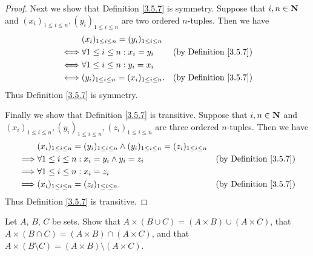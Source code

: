 \begin{proof}
    Next we show that Definition \ref{3.5.7} is symmetry.
    Suppose that \(i, n \in \mathbf{N}\) and \((x_i)_{1 \leq i \leq n}, (y_i)_{1 \leq i \leq n}\) are two ordered \(n\)-tuples.
    Then we have
    \begin{align*}
             & (x_i)_{1 \leq i \leq n} = (y_i)_{1 \leq i \leq n}                                       \\
        \iff & \forall 1 \leq i \leq n : x_i = y_i                & \text{(by Definition \ref{3.5.7})} \\
        \iff & \forall 1 \leq i \leq n : y_i = x_i                                                     \\
        \iff & (y_i)_{1 \leq i \leq n} = (x_i)_{1 \leq i \leq n}. & \text{(by Definition \ref{3.5.7})}
    \end{align*}
    Thus Definition \ref{3.5.7} is symmetry.

    Finally we show that Definition \ref{3.5.7} is transitive.
    Suppose that \(i, n \in \mathbf{N}\) and \((x_i)_{1 \leq i \leq n}, (y_i)_{1 \leq i \leq n}, (z_i)_{1 \leq i \leq n}\) are three ordered \(n\)-tuples.
    Then we have
    \begin{align*}
                 & (x_i)_{1 \leq i \leq n} = (y_i)_{1 \leq i \leq n} \land (y_i)_{1 \leq i \leq n} = (z_i)_{1 \leq i \leq n}                                      \\
        \implies & \forall 1 \leq i \leq n : x_i = y_i \land y_i = z_i                                                       & \text{(by Definition \ref{3.5.7})} \\
        \implies & \forall 1 \leq i \leq n : x_i = z_i                                                                                                            \\
        \implies & (x_i)_{1 \leq i \leq n} = (z_i)_{1 \leq i \leq n}.                                                        & \text{(by Definition \ref{3.5.7})}
    \end{align*}
    Thus Definition \ref{3.5.7} is transitive.
\end{proof}

\begin{exercise}\label{ex 3.5.4}
    Let \(A\), \(B\), \(C\) be sets.
    Show that \(A \times (B \cup C) = (A \times B) \cup (A \times C)\), that \(A \times (B \cap C) = (A \times B) \cap (A \times C)\), and that \(A \times (B \setminus C) = (A \times B) \setminus (A \times C)\).
\end{exercise}

